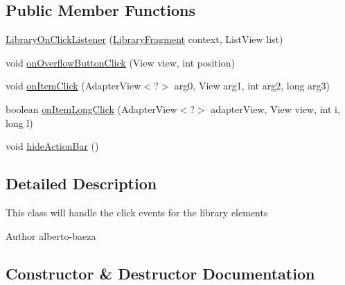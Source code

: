 \subsection*{Public Member Functions}
\begin{DoxyCompactItemize}
\item 
\hyperlink{classandroid_1_1app_1_1printerapp_1_1library_1_1_library_on_click_listener_a0f7ef5f29e96aeb9436ab19913f086cd}{Library\+On\+Click\+Listener} (\hyperlink{classandroid_1_1app_1_1printerapp_1_1library_1_1_library_fragment}{Library\+Fragment} context, List\+View list)
\item 
void \hyperlink{classandroid_1_1app_1_1printerapp_1_1library_1_1_library_on_click_listener_addee91f954f4b285dfea7d651573d4fb}{on\+Overflow\+Button\+Click} (View view, int position)
\item 
void \hyperlink{classandroid_1_1app_1_1printerapp_1_1library_1_1_library_on_click_listener_a2e2b8934f10567edff42745744de6f67}{on\+Item\+Click} (Adapter\+View$<$?$>$ arg0, View arg1, int arg2, long arg3)
\item 
boolean \hyperlink{classandroid_1_1app_1_1printerapp_1_1library_1_1_library_on_click_listener_aa70b915b7149b7a16469dc2470ffc740}{on\+Item\+Long\+Click} (Adapter\+View$<$?$>$ adapter\+View, View view, int i, long l)
\item 
void \hyperlink{classandroid_1_1app_1_1printerapp_1_1library_1_1_library_on_click_listener_ae732fc952bb7dcc7cc6f99d536fe9e35}{hide\+Action\+Bar} ()
\end{DoxyCompactItemize}


\subsection{Detailed Description}
This class will handle the click events for the library elements

\begin{DoxyAuthor}{Author}
alberto-\/baeza 
\end{DoxyAuthor}


\subsection{Constructor \& Destructor Documentation}
\mbox{\label{classandroid_1_1app_1_1printerapp_1_1library_1_1_library_on_click_listener_a0f7ef5f29e96aeb9436ab19913f086cd}} 

